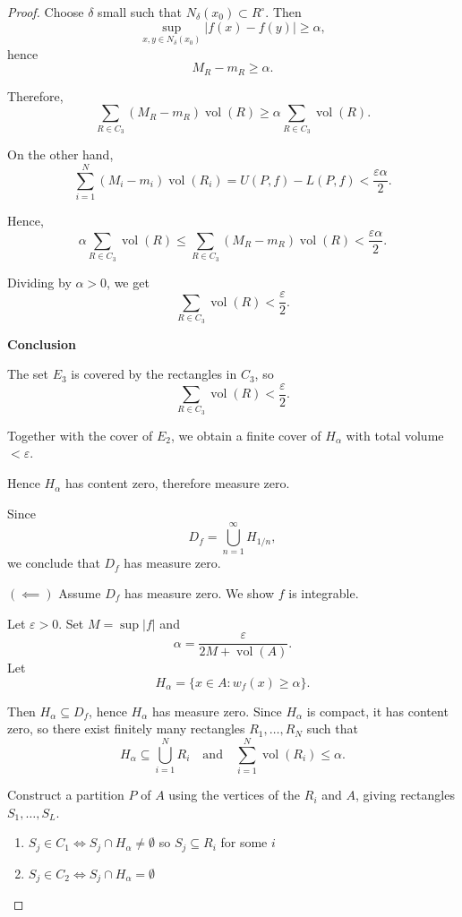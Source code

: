 \documentclass[11pt,openany]{book}
\theoremstyle{plain}
\theoremstyle{definition}
\theoremstyle{remark}
\newcommand{\vol}{\operatorname{vol}}
\begin{document}
\begin{proof}
    Choose $\delta$ small such that $N_\delta(x_0) \subset R^\circ$. Then
    \[
    \sup_{x,y \in N_\delta(x_0)} |f(x)-f(y)| \ge \alpha,
    \]
    hence
    \[
    M_R - m_R \ge \alpha.
    \]

    Therefore,
    \[
    \sum_{R \in C_3} (M_R - m_R)\vol(R) \ge \alpha \sum_{R \in C_3} \vol(R).
    \]

    On the other hand,
    \[
    \sum_{i=1}^N (M_i - m_i)\vol(R_i)
    = U(P,f) - L(P,f)
    < \frac{\varepsilon \alpha}{2}.
    \]

    Hence,
    \[
    \alpha \sum_{R \in C_3} \vol(R)
    \le \sum_{R \in C_3} (M_R - m_R)\vol(R)
    < \frac{\varepsilon \alpha}{2}.
    \]

    Dividing by $\alpha > 0$, we get
    \[
    \sum_{R \in C_3} \vol(R) < \frac{\varepsilon}{2}.
    \]

    \textbf{Conclusion}

    The set $E_3$ is covered by the rectangles in $C_3$, so
    \[
    \sum_{R \in C_3} \vol(R) < \frac{\varepsilon}{2}.
    \]

    Together with the cover of $E_2$, we obtain a finite cover of $H_\alpha$ with total volume $< \varepsilon$.

    Hence $H_\alpha$ has content zero, therefore measure zero.

    Since
    \[
    D_f = \bigcup_{n=1}^{\infty} H_{1/n},
    \]
    we conclude that $D_f$ has measure zero.


$(\impliedby)$ Assume $D_f$ has measure zero. We show $f$ is integrable.

Let $\varepsilon > 0$. Set $M = \sup |f|$ and 
\[
\alpha = \frac{\varepsilon}{2M + \vol(A)}.
\]
Let 
\[
H_\alpha = \{x \in A : w_f(x) \ge \alpha\}.
\]

Then $H_\alpha \subseteq D_f$, hence $H_\alpha$ has measure zero. Since $H_\alpha$ is compact, it has content zero, so there exist finitely many rectangles $R_1,\dots,R_N$ such that
\[
H_\alpha \subseteq \bigcup_{i=1}^N R_i
\quad \text{and} \quad
\sum_{i=1}^N \vol(R_i) \le \alpha.
\]

Construct a partition $P$ of $A$ using the vertices of the $R_i$ and $A$, giving rectangles $S_1,\dots,S_L$.

\begin{enumerate}
    \item $S_j \in C_1 \iff S_j \cap H_\alpha \ne \emptyset$ so $S_j \subseteq R_i$ for some $i$
    \item $S_j \in C_2 \iff S_j \cap H_\alpha = \emptyset$
\end{enumerate}


\end{proof}
\end{document}
